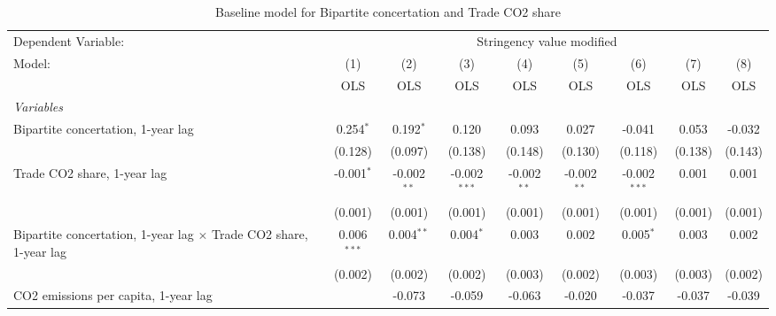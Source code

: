 
\begin{table}[htbp]
   \caption{Baseline model for Bipartite concertation and Trade CO2 share}
   \centering
   \begin{tabular}{lcccccccc}
      \toprule
      Dependent Variable: & \multicolumn{8}{c}{Stringency value modified}\\
      Model:                                                                   & (1)           & (2)           & (3)            & (4)           & (5)           & (6)            & (7)           & (8)\\  
                                                                               &  OLS          & OLS           & OLS            & OLS           & OLS           & OLS            & OLS           & OLS\\  
      \midrule
      \emph{Variables}\\
      Bipartite concertation, 1-year lag                                       & 0.254$^{*}$   & 0.192$^{*}$   & 0.120          & 0.093         & 0.027         & -0.041         & 0.053         & -0.032\\   
                                                                               & (0.128)       & (0.097)       & (0.138)        & (0.148)       & (0.130)       & (0.118)        & (0.138)       & (0.143)\\   
      Trade CO2 share, 1-year lag                                              & -0.001$^{*}$  & -0.002$^{**}$ & -0.002$^{***}$ & -0.002$^{**}$ & -0.002$^{**}$ & -0.002$^{***}$ & 0.001         & 0.001\\   
                                                                               & (0.001)       & (0.001)       & (0.001)        & (0.001)       & (0.001)       & (0.001)        & (0.001)       & (0.001)\\   
      Bipartite concertation, 1-year lag $\times$ Trade CO2 share, 1-year lag  & 0.006$^{***}$ & 0.004$^{**}$  & 0.004$^{*}$    & 0.003         & 0.002         & 0.005$^{*}$    & 0.003         & 0.002\\   
                                                                               & (0.002)       & (0.002)       & (0.002)        & (0.003)       & (0.002)       & (0.003)        & (0.003)       & (0.002)\\   
      CO2 emissions per capita, 1-year lag                                     &               & -0.073        & -0.059         & -0.063        & -0.020        & -0.037         & -0.037        & -0.039\\   

\end{tabular}
\end{table}
